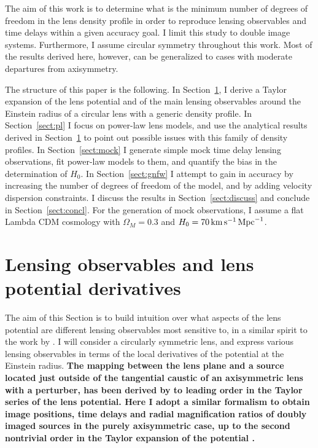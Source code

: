 \documentclass[usenatbib]{mnras}
\def\Sref#1{Section~\ref{#1}\xspace}
\begin{document}
The aim of this work is to determine what is the minimum number of degrees of freedom in the lens density profile in order to reproduce lensing observables and time delays within a given accuracy goal.
I limit this study to double image systems. Furthermore, I assume circular symmetry throughout this work. Most of the results derived here, however, can be generalized to cases with moderate departures from axisymmetry.

The structure of this paper is the following. In \Sref{sect:pot}, I derive a Taylor expansion of the lens potential and of the main lensing observables around the Einstein radius of a circular lens with a generic density profile.
In \Sref{sect:pl} I focus on power-law lens models, and use the analytical results derived in \Sref{sect:pot} to point out possible issues with this family of density profiles.
In \Sref{sect:mock} I generate simple mock time delay lensing observations, fit power-law models to them, and quantify the bias in the determination of $H_0$.
In \Sref{sect:gnfw} I attempt to gain in accuracy by increasing the number of degrees of freedom of the model, and by adding velocity dispersion constraints.
I discuss the results in \Sref{sect:discuss} and conclude in \Sref{sect:concl}.
For the generation of mock observations, I assume a flat Lambda CDM cosmology with $\Omega_M = 0.3$ and $H_0 = 70\,\rm{km}\,{s}^{-1}\,\rm{Mpc}^{-1}$.

\section{Lensing observables and lens potential derivatives}\label{sect:pot}

The aim of this Section is to build intuition over what aspects of the lens potential are different lensing observables most sensitive to, in a similar spirit to the work by \citet{Koc02}.
I will consider a circularly symmetric lens, and express various lensing observables in terms of the local derivatives of the potential at the Einstein radius.
{\bf The mapping between the lens plane and a source located just outside of the tangential caustic of an axisymmetric lens with a perturber, has been derived by \citet{Wag17b} to leading order in the Taylor series of the lens potential.
Here I adopt a similar formalism to obtain image positions, time delays and radial magnification ratios of doubly imaged sources in the purely axisymmetric case, up to the second nontrivial order in the Taylor expansion of the potential \citep[see also][for a similar study in the case of merging triplets and pairs of images]{W+B16, Wag17}.
}
%
\end{document}

